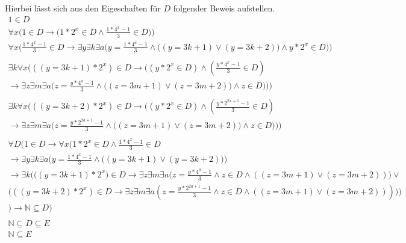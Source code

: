 \documentclass{article}
\begin{document}
Hierbei lässt sich aus den Eigeschaften für $D$ folgender Beweis aufstellen.
\newpage
\begin{gather*}
1 \in D\\
\forall x \Big ( 1 \in D \rightarrow \big (1 * 2^x \in D \wedge \frac{1*4^x-1}{3} \in D \big ) \Big ) \\
\forall x \bigg ( \frac{1*4^x-1}{3} \in D \rightarrow \exists y \exists k \exists a\Big ( y = \frac{1*4^a-1}{3} \wedge \big ( (y = 3k+1) \vee (y = 3k+2) \big ) \wedge y * 2^x \in D \Big ) \bigg ) \\\\
 \exists k \forall x \bigg ( ((y = 3k + 1) * 2^x) \in D \rightarrow \Big ( (y*2^x \in D)\wedge (\frac{y*4^x-1}{3} \in D) \\
\rightarrow \exists z \exists m \exists a \Big ( z = \frac{y*4^a-1}{3} \wedge \big ( (z = 3m+1) \vee (z = 3m+2) \big ) \wedge z \in D \Big )
\bigg ) \Bigg ) \\\\
\exists k \forall x \bigg ( ((y = 3k + 2) * 2^x )\in D \rightarrow \big ( (y*2^x \in D) \wedge (\frac{y*2^{2x+1}-1}{3} \in D) \\
\rightarrow \exists z \exists m \exists a \Big ( z = \frac{y*2^{2a+1}-1}{3} \wedge \big ( (z = 3m+1) \vee (z = 3m+2) \big ) \wedge z \in D \Big )
\bigg ) \Bigg ) \\\\
\forall D 
\Bigg(
1 \in D \rightarrow
\forall x 
\bigg(
1 * 2^x \in D \wedge \frac{1 * 4^x-1}{3} \in D \\ \rightarrow
\exists y \exists k \exists a 
\Big(
y = \frac{1 * 4^x-1}{3} \wedge 
\big(
(
y = 3k + 1
)
\vee 
(
y = 3k + 2
)
\big)
\Big)
\\
\rightarrow \exists k
\Big(
\big(
(y = 3k + 1) 
* 2^x 
\big) \in D
\rightarrow \exists z \exists m \exists a
\big(
 z = \frac{y*4^a-1}{3} \wedge z \in D \wedge
(
( 
z = 3m + 1 
)
\vee
(
z = 3m + 2
)
)
\big)
\vee \\
\big(
(
(y = 3k + 2 )
* 2^x ) \in D
\rightarrow \exists z \exists m \exists a
(
 z = \frac{y*2^{2a+1}-1}{3} \wedge z \in D \wedge
(
( 
z = 3m + 1 
)
\vee
(
z = 3m + 2
)
)
)
\big)
\Big)
\\
\bigg)
\rightarrow 
\mathbb{N} \subseteq D
\Bigg)\\\\
\mathbb{N} \subseteq D \subseteq E \\
\mathbb{N} \subseteq E \\
\end{gather*}
\newpage
\end{document}
